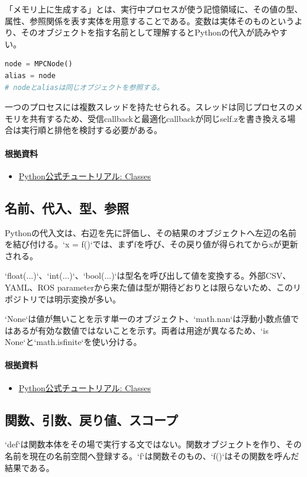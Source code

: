 \documentclass[a4paper,11pt]{article}
\begin{document}
「メモリ上に生成する」とは、実行中プロセスが使う記憶領域に、その値の型、属性、参照関係を表す実体を用意することである。変数は実体そのものというより、そのオブジェクトを指す名前として理解するとPythonの代入が読みやすい。


\begin{lstlisting}[language=python]
node = MPCNode()
alias = node
# nodeとaliasは同じオブジェクトを参照する。
\end{lstlisting}


一つのプロセスには複数スレッドを持たせられる。スレッドは同じプロセスのメモリを共有するため、受信callbackと最適化callbackが同じself.zを書き換える場合は実行順と排他を検討する必要がある。

\paragraph{根拠資料}
\begin{itemize}[leftmargin=1.6em]
\item \href{https://docs.python.org/3/tutorial/classes.html}{Python公式チュートリアル: Classes}
\end{itemize}

\subsection{名前、代入、型、参照}
Pythonの代入文は、右辺を先に評価し、その結果のオブジェクトへ左辺の名前を結び付ける。`x = f()`では、まずfを呼び、その戻り値が得られてからxが更新される。


`float(...)`、`int(...)`、`bool(...)`は型名を呼び出して値を変換する。外部CSV、YAML、ROS parameterから来た値は型が期待どおりとは限らないため、このリポジトリでは明示変換が多い。


`None`は値が無いことを示す単一のオブジェクト、`math.nan`は浮動小数点値ではあるが有効な数値ではないことを示す。両者は用途が異なるため、`is None`と`math.isfinite`を使い分ける。

\paragraph{根拠資料}
\begin{itemize}[leftmargin=1.6em]
\item \href{https://docs.python.org/3/tutorial/classes.html}{Python公式チュートリアル: Classes}
\end{itemize}

\subsection{関数、引数、戻り値、スコープ}
`def`は関数本体をその場で実行する文ではない。関数オブジェクトを作り、その名前を現在の名前空間へ登録する。`f`は関数そのもの、`f()`はその関数を呼んだ結果である。
\end{document}
